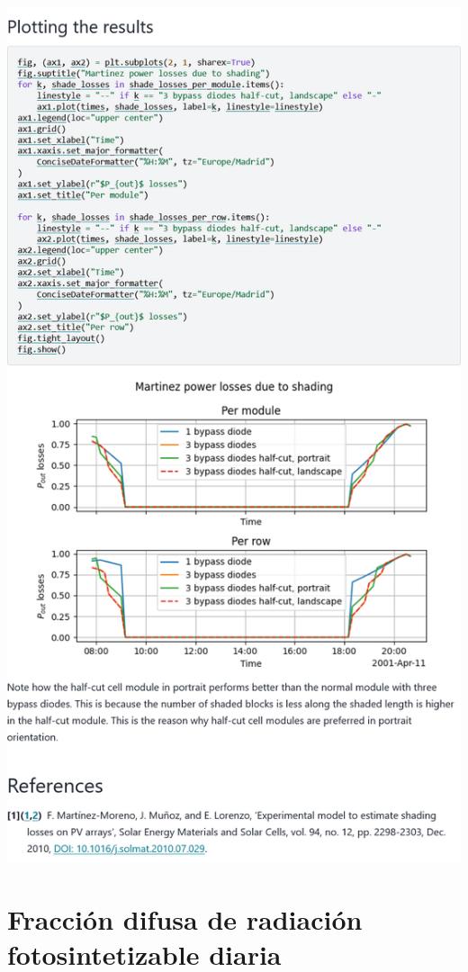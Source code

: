\begin{myparindent}{0pt}
\includegraphics[width=\linewidth,height=0.9\textheight,keepaspectratio]{images/docs_examples_cut/bypass_diodes_3.png}

\newpage\section{Fracción difusa de radiación fotosintetizable diaria} \label{sct:doc_ej_par_difusa}


\end{myparindent}

